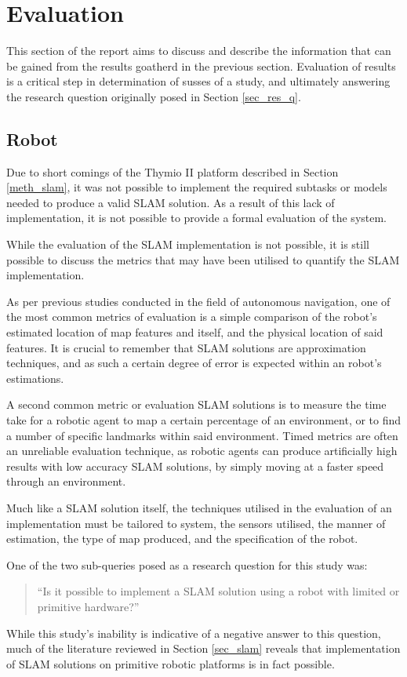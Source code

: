 \section{Evaluation}
This section of the report aims to  discuss and describe the information that
can be gained from the results goatherd in the previous section.
Evaluation of results is a critical step in determination of susses of a
study, and ultimately answering the research question originally posed in
Section \ref{sec_res_q}.

\subsection{Robot}
Due to short comings of the Thymio II platform described in Section
\ref{meth_slam}, it was not possible to implement the required subtasks or
models needed to produce a valid SLAM solution.
As a result of this lack of implementation, it is not possible to provide a
formal evaluation of the system.

While the evaluation  of the SLAM implementation is not possible, it is still
possible to discuss the metrics that may have been utilised to quantify the
SLAM implementation.

As per previous studies conducted in the field of autonomous navigation, one of
the most common metrics of evaluation is a simple comparison of the robot's
estimated location of map features and itself, and the physical location of
said features.
It is crucial to remember that SLAM solutions are approximation techniques,
and as such a certain degree of error is expected within an robot's
estimations.

A second common metric or evaluation SLAM solutions is to measure the time
take for a robotic agent to map a certain percentage of an environment, or to
find a number of specific landmarks within said environment.
Timed metrics are often an unreliable evaluation technique, as robotic agents
can produce artificially high results with low accuracy SLAM solutions, by
simply moving at a faster speed through an environment.

Much like a SLAM solution itself, the techniques utilised in the evaluation of
an implementation must be tailored to system, the sensors utilised, the manner
of estimation, the type of map produced, and the specification of the robot.

One of the two sub-queries posed as a research question for this study was:
\begin{quote}
``Is it possible to implement a SLAM solution using a robot with limited or
primitive hardware?''
\end{quote}
While this study's inability is indicative of a negative answer to this
question, much of the literature reviewed in Section \ref{sec_slam} reveals
that implementation of SLAM solutions on primitive robotic platforms is in
fact possible.

